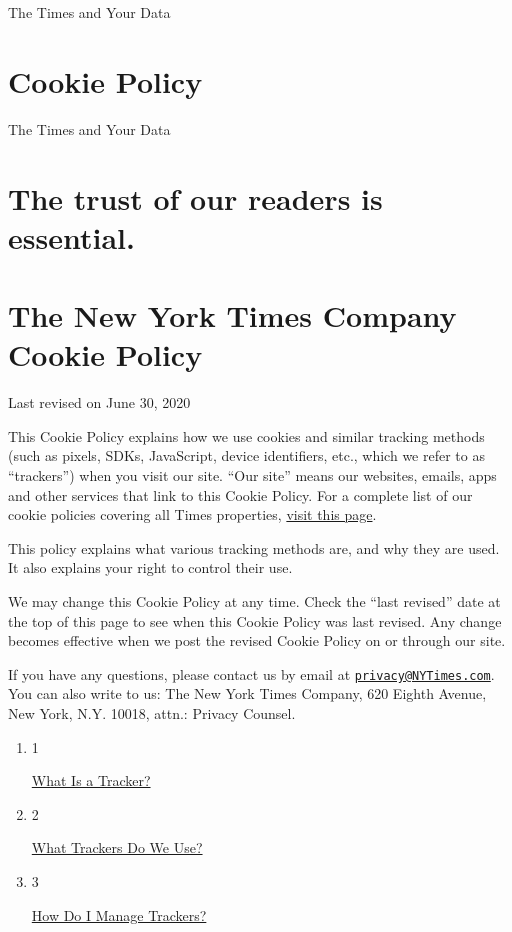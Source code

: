 The Times and Your Data

\hypertarget{cookie-policy}{%
\section{Cookie Policy}\label{cookie-policy}}

The Times and Your Data

\hypertarget{the-trust-of-our-readers-is-essential}{%
\section{The trust of our readers is
essential.}\label{the-trust-of-our-readers-is-essential}}

\hypertarget{the-new-york-times-company-cookie-policy}{%
\section{The New York Times Company Cookie
Policy}\label{the-new-york-times-company-cookie-policy}}

Last revised on June 30, 2020

This Cookie Policy explains how we use cookies and similar tracking
methods (such as pixels, SDKs, JavaScript, device identifiers, etc.,
which we refer to as ``trackers'') when you visit our site. ``Our site''
means our websites, emails, apps and other services that link to this
Cookie Policy. For a complete list of our cookie policies covering all
Times properties,
\href{https://www.nytimes3xbfgragh.onion/subscription/dg-cookie-policy/cookie-policy.html}{visit
this page}.

This policy explains what various tracking methods are, and why they are
used. It also explains your right to control their use.

We may change this Cookie Policy at any time. Check the ``last revised''
date at the top of this page to see when this Cookie Policy was last
revised. Any change becomes effective when we post the revised Cookie
Policy on or through our site.

If you have any questions, please contact us by email at
\href{mailto:privacy@NYTimes.com}{\nolinkurl{privacy@NYTimes.com}}. You
can also write to us: The New York Times Company, 620 Eighth Avenue, New
York, N.Y. 10018, attn.: Privacy Counsel.

\begin{enumerate}
\def\labelenumi{\arabic{enumi}.}
\item
  1

  \href{what-is-a-tracker}{What Is a Tracker?}
\item
  2

  \href{what-trackers-do-we-use}{What Trackers Do We Use?}
\item
  3

  \href{how-do-i-manage-trackers}{How Do I Manage Trackers?}
\end{enumerate}

